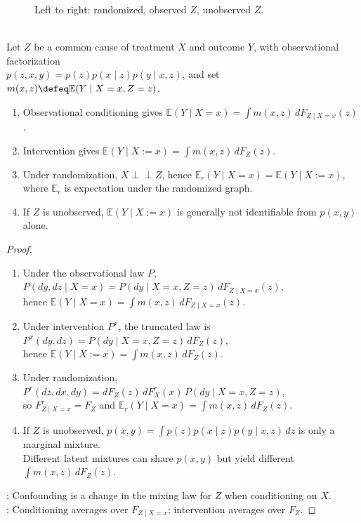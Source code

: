 \begin{figure}[H]
  \centering
  
  \caption{Left to right: randomized, observed $Z$, unobserved $Z$.}
  \label{fig:confounding-dag-types}
\end{figure}

\begin{proposition} \label{prop:dag-confounding-adjustment-connection} \\
Let $Z$ be a common cause of treatment $X$ and outcome $Y$, with observational factorization\\
$p(z,x,y)=p(z)p(x\mid z)p(y\mid x,z)$, and set $m(x,z)\defeq\mathbb{E}(Y\mid X=x,Z=z)$.
\begin{enumerate}[label=(\roman*)]
\setlength{\itemsep}{0pt}
\item Observational conditioning gives $\mathbb{E}(Y\mid X=x)=\int m(x,z)\,dF_{Z\mid X=x}(z)$.
\item Intervention gives $\mathbb{E}(Y\mid X:=x)=\int m(x,z)\,dF_Z(z)$.
\item Under randomization, $X\perp\!\!\!\perp Z$, hence $\mathbb{E}_r(Y\mid X=x)=\mathbb{E}(Y\mid X:=x)$,\\
where $\mathbb{E}_r$ is expectation under the randomized graph.
\item If $Z$ is unobserved, $\mathbb{E}(Y\mid X:=x)$ is generally not identifiable from $p(x,y)$ alone.
\end{enumerate}
\begin{proof}
\begin{enumerate}[label=\roman*.]
\setlength{\itemsep}{0pt}
\item[(i)] Under the observational law $P$, $P(dy,dz\mid X=x)=P(dy\mid X=x,Z=z)\,dF_{Z\mid X=x}(z)$,\\
hence $\mathbb{E}(Y\mid X=x)=\int m(x,z)\,dF_{Z\mid X=x}(z)$.
\item[(ii)] Under intervention $P^x$, the truncated law is $P^x(dy,dz)=P(dy\mid X=x,Z=z)\,dF_Z(z)$,\\
hence $\mathbb{E}(Y\mid X:=x)=\int m(x,z)\,dF_Z(z)$.
\item[(iii)] Under randomization, $P^r(dz,dx,dy)=dF_Z(z)\,dF^r_X(x)\,P(dy\mid X=x,Z=z)$,\\
so $F^r_{Z\mid X=x}=F_Z$ and $\mathbb{E}_r(Y\mid X=x)=\int m(x,z)\,dF_Z(z)$.
\item[(iv)] If $Z$ is unobserved, $p(x,y)=\int p(z)p(x\mid z)p(y\mid x,z)\,dz$ is only a marginal mixture.\\
Different latent mixtures can share $p(x,y)$ but yield different $\int m(x,z)\,dF_Z(z)$.
\end{enumerate}
: Confounding is a change in the mixing law for $Z$ when conditioning on $X$.\\
: Conditioning averages over $F_{Z\mid X=x}$; intervention averages over $F_Z$.
\end{proof}
\end{proposition}

